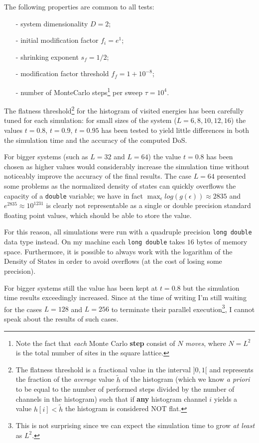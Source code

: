 \documentclass[11pt]{article}
\begin{document}
The following properties are common to all tests:
\begin{itemize}
	\item[-] system dimensionality $D = 2$;
	\item[-] initial modification factor $f_i = e^1$;
	\item[-] shrinking exponent $s_f= 1/2$;
	\item[-] modification factor threshold $f_f= 1 + 10^{-8}$;
	\item[-] number of MonteCarlo steps\footnote{Note the fact that {\em each} Monte Carlo {\bf step} consist of $N$ {\em moves}, where $N=L^2$ is the total number of sites in the square lattice.} per sweep $\tau = 10^4$.
\end{itemize}

The flatness threshold\footnote{The flatness threshold is a fractional value in the interval $]0,1[$ and represents the fraction of the {\em average} value $\tilde h$ of the histogram (which we know {\em a priori} to be equal to the number of performed steps divided by the number of channels in the histogram) such that if {\bf any} histogram channel $i$ yields a value $h[i] < \tilde h$ the histogram is considered NOT flat.}
for the histogram of visited energies has been carefully tuned for each simulation: for small sizes of the system ($L={6,8,10,12,16}$) the values $t=0.8$, $t=0.9$, $t=0.95$ has been tested to yield little differences in both the simulation time and the accuracy of the computed DoS.

For bigger systems (such as $L=32$ and $L=64$) the value $t=0.8$ has been chosen as higher values would considerably increase the simulation time without noticeably improve the accuracy of the final results. The case $L=64$ presented some problems as the normalized density of states can quickly overflows the capacity of a \verb|double| variable; we have in fact $\max_\epsilon log(g(\epsilon)) \approx 2835$ and $e^{2835} \approx 10^{1231}$ is clearly not representable as a single or double precision standard floating point values, which should be able to store the value.

For this reason, all simulations were run with a quadruple precision \verb|long double| data type instead. On my machine each \verb|long double| takes $16$ bytes of memory space. Furthermore, it is possible to always work with the logarithm of the Density of States in order to avoid overflows (at the cost of losing some precision).

For bigger systems still the value has been kept at $t=0.8$ but the simulation time results exceedingly increased. Since at the time of writing I'm still waiting for the cases $L=128$ and $L=256$ to terminate their parallel execution\footnote{This is not surprising since we can expect the simulation time to grow {\em at least} as $L^2$.}, I cannot speak about the results of such cases.
\end{document}
